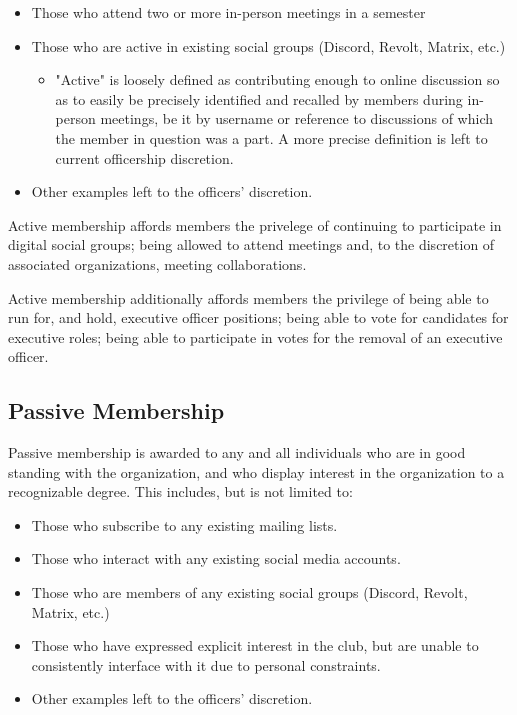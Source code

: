\documentclass[12pt,letterpaper]{article}
\begin{document}
\begin{itemize}
  \item Those who attend two or more in-person meetings in a semester
  \item Those who are active in existing social groups (Discord, Revolt, Matrix, etc.)
    \begin{itemize}
      \item "Active" is loosely defined as contributing enough to online discussion so as
        to easily be precisely identified and recalled by members during in-person
        meetings, be it by username or reference to discussions of which the member in
        question was a part. A more precise definition is left to current officership
        discretion.
    \end{itemize}
  \item Other examples left to the officers' discretion.
\end{itemize}

Active membership affords members the privelege of continuing to participate in digital
social groups; being allowed to attend meetings and, to the discretion of associated
organizations, meeting collaborations.

Active membership additionally affords members the privilege of being able to run for,
and hold, executive officer positions; being able to vote for candidates for executive
roles; being able to participate in votes for the removal of an executive officer.

\subsection{Passive Membership}

Passive membership is awarded to any and all individuals who are in good standing
with the organization, and who display interest in the organization to a recognizable
degree. This includes, but is not limited to:

\begin{itemize}
  \item Those who subscribe to any existing mailing lists.
  \item Those who interact with any existing social media accounts.
  \item Those who are members of any existing social groups (Discord, Revolt, Matrix, etc.)
  \item Those who have expressed explicit interest in the club, but are unable to
    consistently interface with it due to personal constraints.
  \item Other examples left to the officers' discretion.
\end{itemize}
\end{document}
